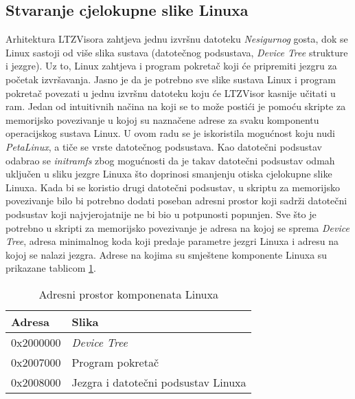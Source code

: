 \documentclass[times, utf8, diplomski, numeric]{fer}
\begin{document}
\subsection{Stvaranje cjelokupne slike Linuxa}
Arhitektura LTZVisora zahtjeva jednu izvršnu datoteku \textit{Nesigurnog} gosta, dok se Linux sastoji od više slika sustava (datotečnog
podsustava, \textit{Device Tree} strukture i jezgre). Uz to, Linux zahtjeva i program pokretač koji će pripremiti jezgru za
početak izvršavanja. Jasno je da je potrebno sve slike sustava Linux i program pokretač povezati u jednu izvršnu datoteku
koju će LTZVisor kasnije učitati u \gls{ram}. Jedan od intuitivnih načina na koji se to može postići je pomoću skripte za memorijsko
povezivanje u kojoj su naznačene adrese za svaku komponentu operacijskog sustava Linux. U ovom radu se je iskoristila mogućnost
koju nudi \textit{PetaLinux}, a tiče se vrste datotečnog podsustava. Kao datotečni podsustav odabrao se
\textit{initramfs} zbog mogućnosti da je takav datotečni podsustav odmah uključen u sliku jezgre Linuxa što doprinosi smanjenju
otiska cjelokupne slike Linuxa. Kada bi se koristio drugi datotečni podsustav, u skriptu za memorijsko povezivanje bilo bi
potrebno dodati poseban adresni prostor koji sadrži datotečni podsustav koji najvjerojatnije ne bi bio u potpunosti popunjen.
Sve što je potrebno u skripti za memorijsko povezivanje je adresa na kojoj se sprema \textit{Device Tree}, adresa minimalnog
koda koji predaje parametre jezgri Linuxa i adresu na kojoj se nalazi jezgra. Adrese na kojima su smještene komponente Linuxa
su prikazane tablicom \ref{adr_space}.

\begin{table}[H]
  \centering
  \begin{tabular}{ | p{3cm} | p{6cm} |}
    \hline
    \textbf{Adresa} & \textbf{Slika}\\
    \hline
    0x2000000 & \textit{Device Tree}\\
    \hline
    0x2007000 & Program pokretač\\
    \hline
    0x2008000 & Jezgra i datotečni podsustav  Linuxa\\
    \hline
  \end{tabular}
  \caption{Adresni prostor komponenata Linuxa}
  \label{adr_space}
\end{table}
\end{document}
